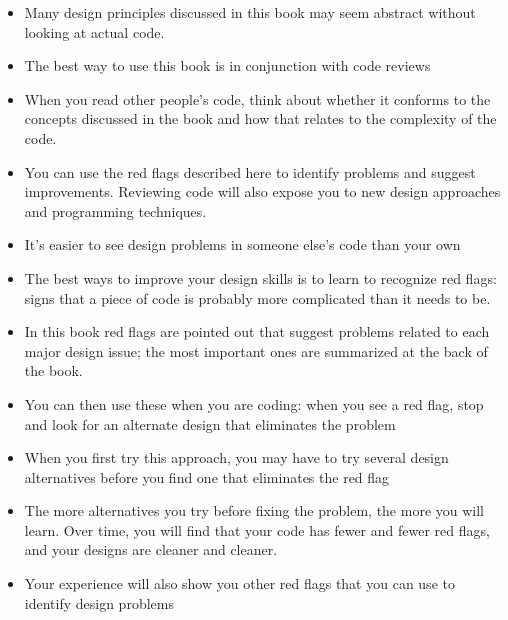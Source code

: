 { 
	
	
	\begin{itemize}
		\item Many design principles discussed in this book may seem abstract without looking at actual code.
		
	\item	The best way to use this book is in conjunction with code reviews
	\item	When you read other people’s code, think about whether it conforms to the concepts discussed in the book and how that relates to the complexity of the code.
	\item	You can use the red flags described here to identify problems and suggest improvements. Reviewing code will also expose you to new design approaches and programming techniques.
	\item	It’s easier to see design problems in someone else’s code than your own
		
		
		
	\end{itemize}
}

{ 
	
	
	\begin{itemize}
		\item The best ways to improve your design skills is to learn to recognize red flags: signs that a piece of code is probably more complicated than it needs to be.
	\item	In this book  red flags are pointed out that suggest problems related to each major design issue; the most important ones are summarized at the back of the book.
	
	\item	You can then use these when you are coding: when you see a red flag, stop and look for an alternate design that eliminates the problem
	
	\item	When you first try this approach, you may have to try several design alternatives before you find one that eliminates the red flag
	
	\item	The more alternatives you try before fixing the problem, the more you will learn. Over time, you will find that your code has fewer and fewer red flags, and your designs are cleaner and cleaner.
	
	\item Your experience will also show you other red flags that you can use to identify design problems
		
		
		
		
	\end{itemize}
}


